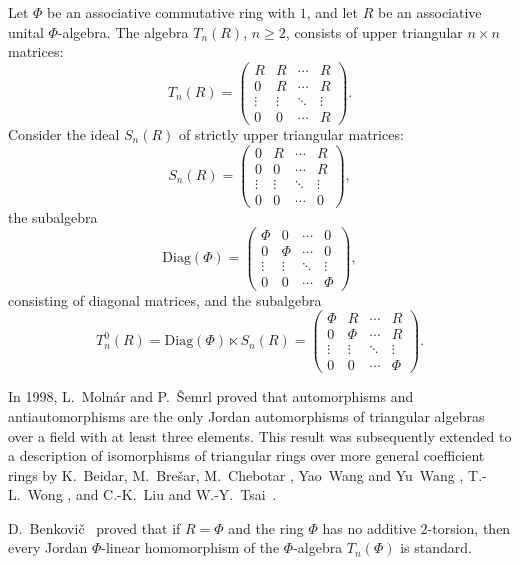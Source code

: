 \documentclass[12pt]{amsart}
\begin{document}
{Let $ \Phi$ be an associative commutative ring with $1$, 
and let $R$ be an associative unital $ \Phi $-algebra.   The algebra \( T_n(R) \), \( n \geq 2 \), consists of upper triangular \( n \times n \) matrices:  
\[
T_n(R) = 
\begin{pmatrix}
R & R & \cdots & R \\
					0 & R & \cdots & R \\
					\vdots & \vdots & \ddots & \vdots \\
					0 & 0 & \cdots & R
				\end{pmatrix}.
\]
Consider  the ideal \( S_n(R) \) of strictly upper triangular matrices:
\[
S_n(R) = 
\begin{pmatrix}
	0 & R & \cdots & R \\
	0 & 0 & \cdots & R \\
	\vdots & \vdots & \ddots & \vdots \\
	0 & 0 & \cdots & 0
\end{pmatrix},
\]
 the subalgebra \[ \mathrm{Diag}(\Phi) = 
\begin{pmatrix}
\Phi & 0 & \cdots & 0 \\
	0 &\Phi & \cdots & 0 \\
	\vdots & \vdots & \ddots & \vdots \\
	0 & 0 & \cdots & \Phi
\end{pmatrix},
\] consisting of diagonal matrices, and the subalgebra
\[
T_n^0(R) = \mathrm{Diag}(\Phi) \ltimes S_n(R) = \begin{pmatrix}
\Phi & R & \cdots & R \\
0 & \Phi & \cdots & R \\
\vdots & \vdots & \ddots & \vdots \\
0 & 0 & \cdots & \Phi
\end{pmatrix}.
\]

In 1998,  L.~Moln\'{a}r and P.~\v{S}emrl  \cite{Molnar_Semrl} proved that automorphisms and antiautomorphisms are the only Jordan automorphisms of triangular algebras over a field with at least three elements.  This result was subsequently extended to a  description of isomorphisms of  triangular rings over more general  coefficient rings by K.~Beidar, M.~Bre\v{s}ar, M.~Chebotar \cite{BBC}, Yao~Wang and Yu~Wang \cite{Yiqiu_Wang}, T.-L.~Wong \cite{Wong}, and C.-K.~Liu and W.-Y.~Tsai~\cite{Liu_Tsai}. 

D.~Benkovi\v{c}~\cite{Benkovic}  proved that if \( R =\Phi  \)  
and the ring \( \Phi  \) has no additive $2$-torsion,  
then every Jordan $\Phi $-linear homomorphism of the \( \Phi  \)-algebra \( T_n(\Phi ) \) is standard.

}
\end{document}
